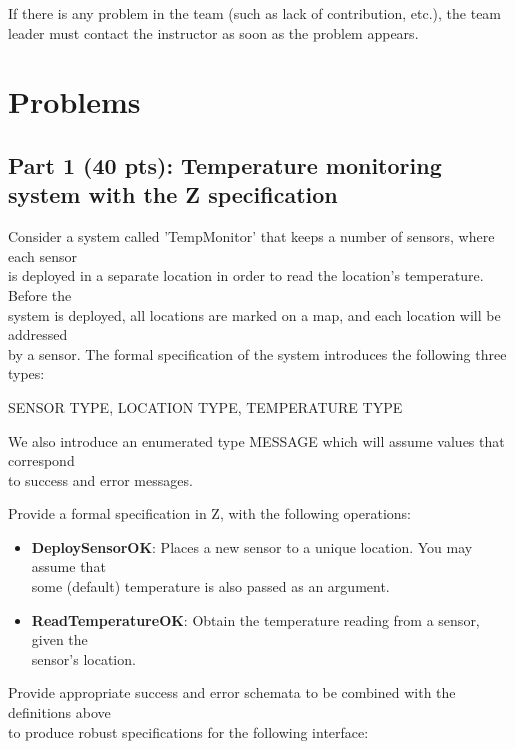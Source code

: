 \documentclass[12pt]{article}
\begin{document}
\noindent If there is any problem in the team (such as lack of contribution, etc.), the team leader must contact the instructor as soon as the problem appears.

\noindent 
\newpage

\section{Problems}

\subsection{Part 1 (40 pts): Temperature monitoring system with
the Z specification}

\noindent Consider a system called ’TempMonitor’ that keeps a number of sensors, where each sensor\\
is deployed in a separate location in order to read the location’s temperature. Before the\\
system is deployed, all locations are marked on a map, and each location will be addressed\\
by a sensor. The formal specification of the system introduces the following three types:

\begin{center}
	SENSOR TYPE, LOCATION TYPE, TEMPERATURE TYPE
\end{center} 

\noindent We also introduce an enumerated type MESSAGE which will assume values that correspond\\
to success and error messages.

\noindent Provide a formal specification in Z, with the following operations:
\begin{itemize}
	\item \textbf{DeploySensorOK}: Places a new sensor to a unique location. You may assume that\\
	some (default) temperature is also passed as an argument.
	\item \textbf{ReadTemperatureOK}: Obtain the temperature reading from a sensor, given the \\
	sensor’s location.
\end{itemize}

\noindent Provide appropriate success and error schemata to be combined with the definitions above\\
to produce robust specifications for the following interface:
\end{document}
